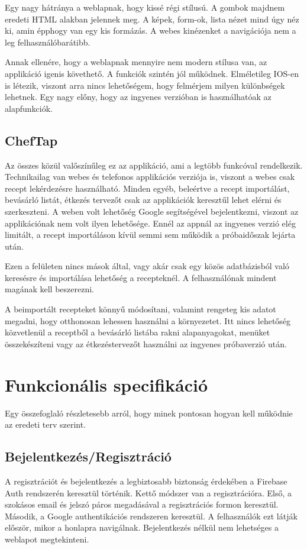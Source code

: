 \documentclass[12pt]{report}
\theoremstyle{definition}
\begin{document}
Egy nagy hátránya a weblapnak, hogy kissé régi stílusú. A gombok majdnem eredeti HTML alakban jelennek meg. A képek, form-ok, lista nézet mind úgy néz ki, amin épphogy van egy kis formázás. A webes kinézenket a navigációja nem a leg felhasználóbarátibb.

Annak ellenére, hogy a weblapnak mennyire nem modern stílusa van, az applikáció igenis követhető. A funkciók szintén jól működnek. Elméletileg IOS-en is létezik, viszont arra nincs lehetőségem, hogy felmérjem milyen különbségek lehetnek. Egy nagy előny, hogy az ingyenes verzióban is használhatóak az alapfunkciók.

\section{ChefTap}
Az összes közül valőszínűleg ez az applikáció, ami a legtöbb funkcóval rendelkezik. Technikailag van webes és telefonos applikációs verziója is, viszont a webes csak recept lekérdezésre használható. Minden egyéb, beleértve a recept importálást, bevásárló listát, étkezés tervezőt csak az applikációk keresztűl lehet elérni és szerkeszteni. A weben volt lehetőség Google segítségével bejelentkezni, viszont az applikációnak nem volt ilyen lehetősége. Ennél az appnál az ingyenes verzió elég limitált, a recept importáláson kívül semmi sem működik a próbaidőszak lejárta után.

Ezen a felületen nincs mások által, vagy akár csak egy közös adatbázisból való keresésre és importálása lehetőség a recepteknél. A felhasználónak mindent magának kell beszerezni.

A beimportált recepteket könnyű módosítani, valamint rengeteg kis adatot megadni, hogy otthonosan lehessen használni a környezetet. Itt nincs lehetőség közvetlenül a receptből a bevásárló listába rakni alapanyagokat, menüket összekészíteni vagy az étkezéstervezőt használni az ingyenes próbaverzió után.

\chapter{Funkcionális specifikáció}
Egy összefoglaló részletesebb arról, hogy minek pontosan hogyan kell működnie az eredeti terv szerint.

\section{Bejelentkezés/Regisztráció}
A regisztrációt és bejelentkezés a legbiztosabb biztonság érdekében a Firebase Auth rendszerén keresztül történik. Kettő módszer van a regisztrációra. Első, a szokásos email és jelszó páros megadásával a regisztrációs formon keresztül. Második, a Google authentikációs rendszeren keresztül. A felhasználók ezt látják először, mikor a honlapra navigálnak. Bejelentkezés nélkül nem lehetséges a weblapot megtekinteni.
\end{document}
